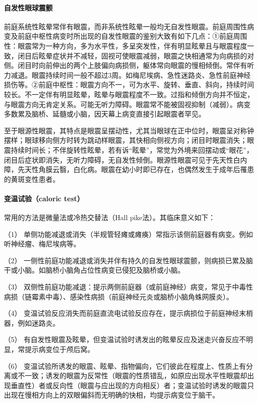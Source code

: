 \paragraph{自发性眼球震颤}

前庭系统性眩晕常伴有眼震，而非系统性眩晕一般均无自发性眼震。前庭周围性病变及前庭中枢性病变时所出现的自发性眼震的鉴别大致有如下几点：①前庭周围性：眼震常为一种方向，多为水平性，多呈突发性，伴有明显眩晕且与眼震程度一致，闭目后眩晕症状并不减轻，固视可使眼震减弱，眼震之快相通常为向病损的对侧。闭目时向前伸出的两个上肢偏向病损侧，躯体常向眼震的慢相倾倒。常伴有听力减退。眼震持续时间一般不超过3周。如梅尼埃病、急性迷路炎、急性前庭神经损伤等。②前庭中枢性：眼震方向不一，可为水平、旋转、垂直、斜向，持续时间较长。不一定伴有明显眩晕，眩晕与眼震程度不一致。过指和倾倒方向并不恒定，与眼震方向无肯定关系。可能无听力障碍。眼震常不能被固视抑制（减弱）。病变多数累及脑桥、延髓或小脑，因天幕上病变直接引起眼震者罕见。

至于眼源性眼震，其特点是眼震呈摆动性，尤其当眼球在正中位时，眼震呈对称钟摆样；眼球移向侧方时转为跳动样眼震，其快相向侧视方向；闭目时眼震消失；眼震持续时间长；不伴旋转性眩晕，若有诉“眩晕”，常觉为外境来回摆动或“眼花”，闭目后症状即消失，无听力障碍，无自发性倾倒。眼源性眼震可见于先天性白内障，先天性角膜云翳，白化病。眼震在幼小时即已存在，也偶然发生于成年后罹患的黄斑变性患者。

\paragraph{变温试验（caloric test）}

常用的方法是微量法或冷热交替法（Hall pike法）。其临床意义如下：

（1）
单侧功能减退或消失（半规管轻瘫或瘫痪）常指示该侧前庭器有病变。例如听神经瘤、梅尼埃病等。

（2）
一侧性前庭功能减退或消失并伴有持久的自发性眼球震颤，则病损已累及脑干或小脑。如脑桥小脑角占位性病变已侵犯及脑桥或小脑。

（3）
双侧性前庭功能减退：提示两侧前庭器（或前庭神经）病变，常见于中毒性病损（链霉素中毒）、感染性病损（前庭神经元炎或脑桥小脑角蛛网膜炎）。

（4）
变温试验反应消失而前庭直流电试验反应存在，提示病损位于前庭神经末梢器，例如迷路炎。

（5）
有自发性眼震及眩晕，但变温试验时诱发出的眩晕反应及迷走兴奋反应不明显，常提示病变位于颅后窝。

（6）
变温试验所诱发的眼震、眩晕、指物偏向，它们彼此在程度上、性质上有分离或不一致；诱发的眼震为反常性（眼震的性质错乱，如原应出现水平性眼震却出现垂直性）者或反向性（眼震与应出现的方向相反）者；变温试验时诱发的眼震只出现在慢相方向上的双眼偏斜而无明确的快相，均提示病变位于脑干。

